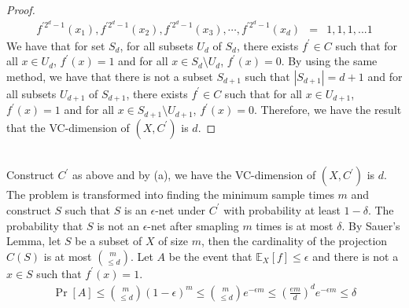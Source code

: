\begin{proof}
\begin{align}
        \nonumber f^{\prime 2^d-1}(x_1),f^{\prime 2^d-1}(x_2),f^{\prime 2^d-1}(x_3),\cdots, f^{\prime 2^d-1}(x_d)&=&1,1,1,...1
    \end{align}
    We have that for set $S_d$, for all subsets $U_d$ of $S_d$, there exists $f^{\prime} \in C$ such that for all $x\in U_d$, $f^{\prime}(x) =1$ and for all $x\in S_d\setminus U_d$, $f^{\prime}(x)=0$.
    By using the same method, we have that there is not a subset $S_{d+1}$ such that $|S_{d+1}|=d+1$ and for all subsets $U_{d+1}$ of $S_{d+1}$, there exists $f^{\prime}\in C$ such that for all $x\in U_{d+1}$, $f^{\prime}(x)=1$ and for all $x\in S_{d+1}\setminus U_{d+1}$, $f^{\prime}(x)=0$.
    Therefore, we have the result that the VC-dimension of $(X, C^{\prime})$ is $d$.
\end{proof}
\noindent{}
\\
Construct $C^{\prime}$ as above and by (a), we have the VC-dimension of $(X, C^{\prime})$ is $d$.
The problem is transformed into finding the minimum sample times $m$ and construct $S$ such that $S$ is an 
$\epsilon$-net under $C^{\prime}$ with probability at least $1-\delta$.
The probability that $S$ is not an $\epsilon$-net after smapling $m$ times is at most $\delta$.
By Sauer's Lemma, let $S$ be a subset of $X$ of size $m$, then the cardinality of the projection $C(S)$ is at most $\binom{m}{\le d}$.
Let $A$ be the event that $\mathbb{E}_X[f]\le \epsilon$ and there is not a $x\in S$ such that $f^{\prime}(x)=1$.
\begin{align}
    \nonumber \Pr\left[A\right]\le \binom{m}{\le d}\left(1-\epsilon\right)^m \le \binom{m}{\le d}e^{-\epsilon m}\le \left(\frac{em}{d}\right)^d e^{-\epsilon m}\le \delta
\end{align} 

